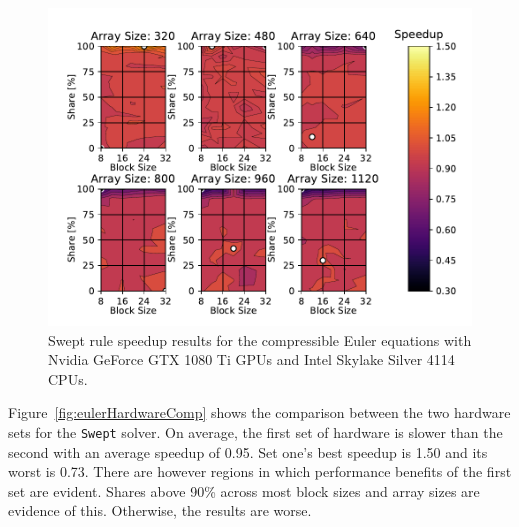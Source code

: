 \documentclass[preprints,article,accept,moreauthors,pdftex]{Definitions/mdpi}
\def\Swept{\texttt{Swept}}
\newcommand\fs{0.7}
\def\oldCPU{Intel Skylake Silver 4114} %
\def\oldGPU{Nvidia GeForce GTX 1080 Ti}
\begin{document}
\begin{figure}[H]
    
    \begin{center}
        \includegraphics[scale=\fs, trim={0.75cm 0.4cm 0.8cm 0.7cm},clip]{figs/speedUpeulerOld.pdf}
        \caption{Swept rule speedup results  for the compressible Euler equations with \oldGPU{} GPUs and \oldCPU{} CPUs.}
        \label{fig:oldSpeedupEuler}
    \end{center}
\end{figure}




Figure~\ref{fig:eulerHardwareComp} shows the comparison between the two hardware sets for the \Swept{} solver. On average, the first set of hardware is slower than the second with an average speedup of 0.95. Set one's best speedup is 1.50 and its worst is 0.73. There are however regions in which performance benefits of the first set are evident. Shares above 90\% across most block sizes and array sizes are evidence of this. Otherwise, the results are worse. 
\end{document}
